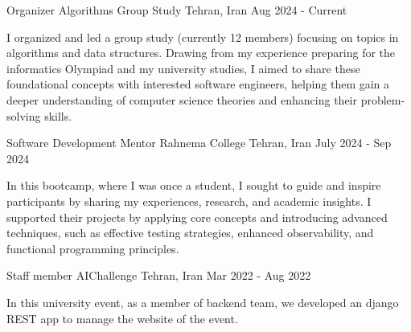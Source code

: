 

\begin{cventries}
  \cventry
  {Organizer} %
  {Algorithms Group Study} %
  {Tehran, Iran} %
  {Aug 2024 - Current} %
  {
    \begin{cvitems}
    \item {I organized and led a group study (currently 12 members) focusing on topics in algorithms and data structures. Drawing from my experience preparing for the informatics Olympiad and my university studies, I aimed to share these foundational concepts with interested software engineers, helping them gain a deeper understanding of computer science theories and enhancing their problem-solving skills.}
    \end{cvitems}
  }

  \cventry
  {Software Development Mentor} %
  {Rahnema College} %
  {Tehran, Iran} %
  {July 2024 - Sep 2024} %
  {
    \begin{cvitems}
    \item {In this bootcamp, where I was once a student, I sought to guide and
        inspire participants by sharing my experiences, research, and academic
        insights. I supported their projects by applying core concepts and
        introducing advanced techniques, such as effective testing strategies,
        enhanced observability, and functional programming principles.
      }
    \end{cvitems}
  }

  \cventry
  {Staff member} %
  {AIChallenge} %
  {Tehran, Iran} %
  {Mar 2022 - Aug 2022} %
  {
    \begin{cvitems} %
      \item {In this university event, as a member of backend team, we developed an django REST app to manage the website of the event. }
    \end{cvitems}
  }
\end{cventries}
